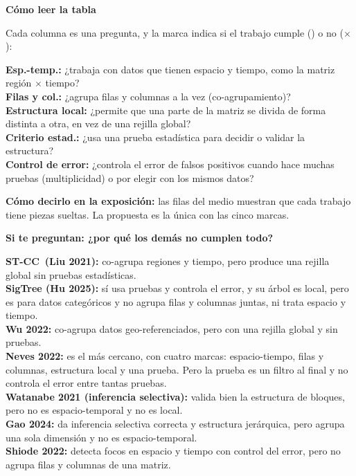 \documentclass[11pt,a4paper]{article}
\newcommand{\cajainicio}[3]{\par\medskip\noindent
  \begin{lrbox}{\cajabox}\begin{minipage}{\dimexpr\linewidth-2\fboxsep-2\fboxrule\relax}%
  \textbf{\color{#1}#3}\par\smallskip}
\newcommand{\cajafin}[2]{\end{minipage}\end{lrbox}\fcolorbox{#1}{#2}{\usebox{\cajabox}}\par\medskip}
\newenvironment{nota}[1]{\cajainicio{acc}{acc!7}{#1}}{\cajafin{acc}{acc!7}}
\newcommand{\STCC}{ST-CC}
\begin{document}
\begin{nota}{Cómo leer la tabla}
Cada columna es una pregunta, y la marca indica si el trabajo cumple (\checkmark) o no ($\times$):

\textbf{Esp.-temp.:} ¿trabaja con datos que tienen espacio y tiempo, como la matriz región $\times$ tiempo?\\
\textbf{Filas y col.:} ¿agrupa filas y columnas a la vez (co-agrupamiento)?\\
\textbf{Estructura local:} ¿permite que una parte de la matriz se divida de forma distinta a otra, en vez de una rejilla global?\\
\textbf{Criterio estad.:} ¿usa una prueba estadística para decidir o validar la estructura?\\
\textbf{Control de error:} ¿controla el error de falsos positivos cuando hace muchas pruebas (multiplicidad) o por elegir con los mismos datos?

\textbf{Cómo decirlo en la exposición:} las filas del medio muestran que cada trabajo tiene piezas sueltas. La propuesta es la única con las cinco marcas.
\end{nota}

\begin{nota}{Si te preguntan: ¿por qué los demás no cumplen todo?}
\textbf{\STCC\ (Liu 2021):} co-agrupa regiones y tiempo, pero produce una rejilla global sin pruebas estadísticas.\\
\textbf{SigTree (Hu 2025):} sí usa pruebas y controla el error, y su árbol es local, pero es para datos categóricos y no agrupa filas y columnas juntas, ni trata espacio y tiempo.\\
\textbf{Wu 2022:} co-agrupa datos geo-referenciados, pero con una rejilla global y sin pruebas.\\
\textbf{Neves 2022:} es el más cercano, con cuatro marcas: espacio-tiempo, filas y columnas, estructura local y una prueba. Pero la prueba es un filtro al final y no controla el error entre tantas pruebas.\\
\textbf{Watanabe 2021 (inferencia selectiva):} valida bien la estructura de bloques, pero no es espacio-temporal y no es local.\\
\textbf{Gao 2024:} da inferencia selectiva correcta y estructura jerárquica, pero agrupa una sola dimensión y no es espacio-temporal.\\
\textbf{Shiode 2022:} detecta focos en espacio y tiempo con control del error, pero no agrupa filas y columnas de una matriz.
\end{nota}
\end{document}
